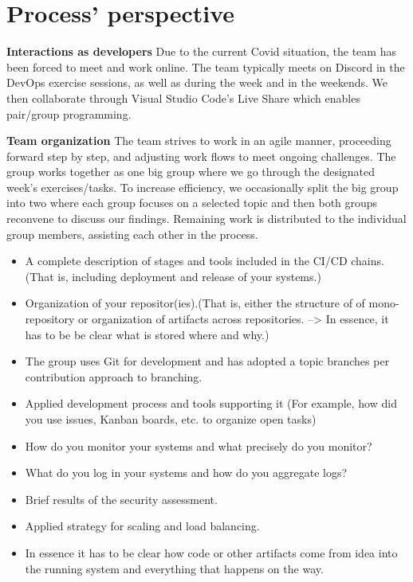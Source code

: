 \section{Process' perspective}

\textbf{Interactions as developers}\newline
  Due to the current Covid situation, the team has been forced to meet and work online. The team typically meets on Discord in the DevOps
  exercise sessions, as well as during the week and in the weekends. We then collaborate through Visual Studio Code's Live Share which enables pair/group programming. 
  \newline
 
\textbf{Team organization}\newline
  The team strives to work in an agile manner, proceeding forward step by step, and adjusting work flows to meet ongoing challenges. The group works together as one big group where we go through the designated week's exercises/tasks. 
  To increase efficiency, we occasionally split the big group into two where each group focuses on a selected topic
  and then both groups reconvene to discuss our findings. Remaining work is distributed to the individual group members, assisting each other in the process.

  
  \begin{itemize}
  \item A complete description of stages and tools included in the CI/CD chains.(That is, including deployment and release of your systems.)
  \item Organization of your repositor(ies).(That is, either the structure of of mono-repository or organization of artifacts across repositories. --> In essence, it has to be be clear what is stored where and why.) 
  \item The group uses Git for development and has adopted a topic branches per contribution approach to branching.
  \item Applied development process and tools supporting it (For example, how did you use issues, Kanban boards, etc. to organize open tasks)
  \item How do you monitor your systems and what precisely do you monitor?
  \item What do you log in your systems and how do you aggregate logs?
  \item Brief results of the security assessment.
  \item Applied strategy for scaling and load balancing.
  \item In essence it has to be clear how code or other artifacts come from idea into the running system and everything that happens on the way.
  
\end{itemize}